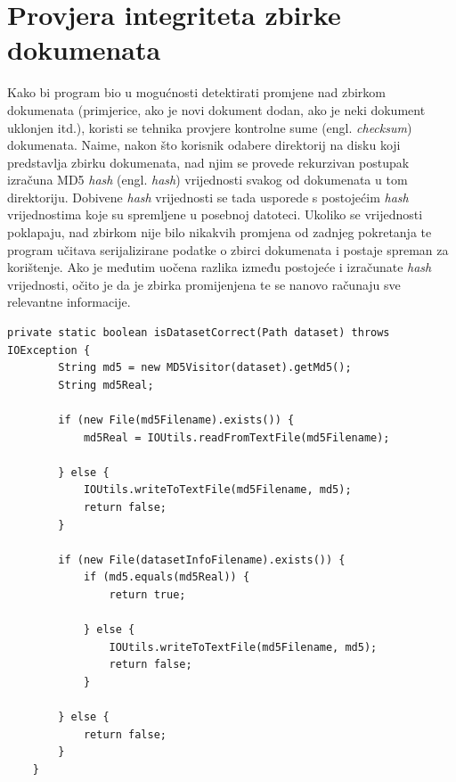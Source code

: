 \documentclass[times, utf8, zavrsni]{fer}
\begin{document}
\section{Provjera integriteta zbirke dokumenata}
Kako bi program bio u mogućnosti detektirati promjene nad zbirkom dokumenata (primjerice, ako je novi dokument dodan, ako je neki dokument uklonjen itd.), koristi se tehnika provjere kontrolne sume (engl. \textit{checksum}) dokumenata. Naime, nakon što korisnik odabere direktorij na disku koji predstavlja zbirku dokumenata, nad njim se provede rekurzivan postupak izračuna MD5 \textit{hash} (engl. \textit{hash}) vrijednosti svakog od dokumenata u tom direktoriju. Dobivene \textit{hash} vrijednosti se tada usporede s postojećim \textit{hash} vrijednostima koje su spremljene u posebnoj datoteci. Ukoliko se vrijednosti poklapaju, nad zbirkom nije bilo nikakvih promjena od zadnjeg pokretanja te program učitava serijalizirane podatke o zbirci dokumenata i postaje spreman za korištenje. Ako je međutim uočena razlika između postojeće i izračunate \textit{hash} vrijednosti, očito je da je zbirka promijenjena te se nanovo računaju sve relevantne informacije.

\begin{lstlisting}[caption={Isječak programskog koda za provjeru ispravnosti zbirke},captionpos=b]
    private static boolean isDatasetCorrect(Path dataset) throws IOException {
        String md5 = new MD5Visitor(dataset).getMd5();
        String md5Real;
    
        if (new File(md5Filename).exists()) {
            md5Real = IOUtils.readFromTextFile(md5Filename);
    
        } else {
            IOUtils.writeToTextFile(md5Filename, md5);
            return false;
        }
    
        if (new File(datasetInfoFilename).exists()) {
            if (md5.equals(md5Real)) {
                return true;
    
            } else {
                IOUtils.writeToTextFile(md5Filename, md5);
                return false;
            }
    
        } else {
            return false;
        }
    }
    \end{lstlisting}
\end{document}
